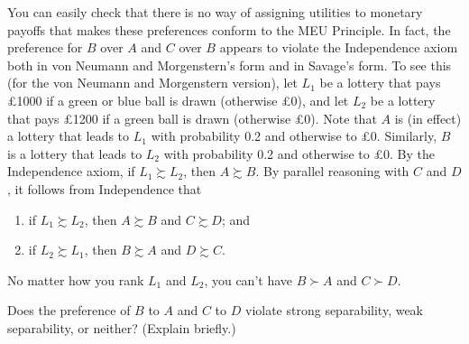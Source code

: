 You can easily check that there is no way of assigning utilities to
monetary payoffs that makes these preferences conform to the MEU
Principle. In fact, the preference for $B$ over $A$ and $C$ over $B$
appears to violate the Independence axiom both in von Neumann and
Morgenstern's form and in Savage's form. To see this (for the von
Neumann and Morgenstern version), let $L_1$ be a lottery that pays
£1000 if a green or blue ball is drawn (otherwise £0), and let $L_2$
be a lottery that pays £1200 if a green ball is drawn (otherwise
£0). Note that $A$ is (in effect) a lottery that leads to $L_1$ with
probability 0.2 and otherwise to £0. Similarly, $B$ is a lottery that
leads to $L_2$ with probability 0.2 and otherwise to £0. By the
Independence axiom, if $L_1 \succsim L_2$, then $A \succsim B$. By
parallel reasoning with $C$ and $D$, it follows from Independence that
\begin{enumerate}
  \itemsep0em 
\item if $L_1 \succsim L_2$, then $A \succsim B$ and $C \succsim D$; and
\item if $L_2 \succsim L_1$, then $B \succsim A$ and $D \succsim C$.
\end{enumerate}
No matter how you rank $L_1$ and $L_2$, you can't have $B \succ A$ and $C \succ D$.

\begin{exercise2}
  Does the preference of $B$ to $A$ and $C$ to $D$ violate strong
  separability, weak separability, or neither? (Explain briefly.)
\end{exercise2}


